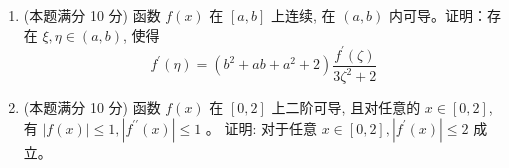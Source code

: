 \begin{enumerate}


\item 	
(本题满分 10 分)	
函数 $f(x)$ 在 $[a, b]$ 上连续, 在 $(a, b)$ 内可导。证明：存在 $\xi, \eta \in(a, b)$, 使得
\[
f^{\prime}(\eta)=\left(b^{2}+a b+a^{2}+2\right) \frac{f^{\prime}(\zeta)}{3 \zeta^{2}+2}
\]




\item 	
(本题满分 10 分)	
函数 $f(x)$ 在 $[0,2]$ 上二阶可导, 且对任意的 $x \in[0,2]$, 有 $|f(x)| \leqslant 1,\left|f^{\prime \prime}(x)\right| \leqslant 1$ 。 证明: 对于任意 $x \in[0,2],\left|f^{\prime}(x)\right| \leqslant 2$ 成立。


	
	
\end{enumerate}


